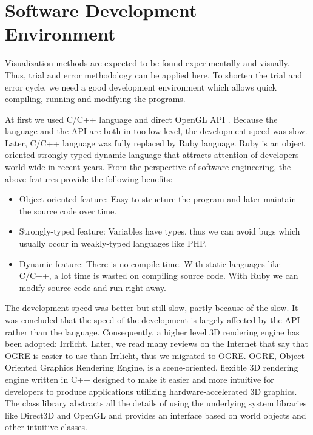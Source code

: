 
\section{Software Development Environment}

Visualization methods are expected to be found experimentally and visually. Thus, trial and error methodology can be applied here. To shorten the trial and error cycle, we need a good development environment which allows quick compiling, running and modifying the programs.

At first we used C/C++ language and direct OpenGL API \cite{Reference10}. Because the language and the API are both in too low level, the development speed was slow. Later, C/C++ language was fully replaced by Ruby language. Ruby is an object oriented strongly-typed dynamic language that attracts attention of developers world-wide in recent years. From the perspective of software engineering, the above features provide the following benefits:

\begin{itemize}
	\item Object oriented feature: Easy to structure the program and later maintain the source code over time.
	\item Strongly-typed feature: Variables have types, thus we can avoid bugs which usually occur in weakly-typed languages like PHP.
	\item Dynamic feature: There is no compile time. With static languages like C/C++, a lot time is wasted on compiling source code. With Ruby we can modify source code and run right away.
\end{itemize}

The development speed was better but still slow, partly because of the slow. It was concluded that the speed of the development is largely affected by the API rather than the language. Consequently, a higher level 3D rendering engine has been adopted: Irrlicht. Later, we read many reviews on the Internet that say that OGRE \cite{Reference11} is easier to use than Irrlicht, thus we migrated to OGRE. OGRE, Object-Oriented Graphics Rendering Engine, is a scene-oriented, flexible 3D rendering engine written in C++ designed to make it easier and more intuitive for developers to produce applications utilizing hardware-accelerated 3D graphics. The class library abstracts all the details of using the underlying system libraries like Direct3D and OpenGL and provides an interface based on world objects and other intuitive classes.

